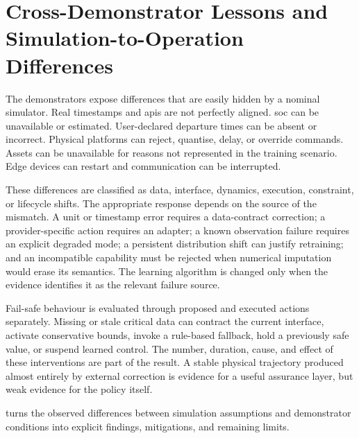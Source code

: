\section{Cross-Demonstrator Lessons and Simulation-to-Operation Differences}
\label{sec:real-lessons}
\label{sec:sim2op}

The demonstrators expose differences that are easily hidden by a nominal simulator. Real timestamps and \glspl{api} are not perfectly aligned. \gls{soc} can be unavailable or estimated. User-declared departure times can be absent or incorrect. Physical platforms can reject, quantise, delay, or override commands. Assets can be unavailable for reasons not represented in the training scenario. Edge devices can restart and communication can be interrupted.

These differences are classified as data, interface, dynamics, execution, constraint, or lifecycle shifts. The appropriate response depends on the source of the mismatch. A unit or timestamp error requires a data-contract correction; a provider-specific action requires an adapter; a known observation failure requires an explicit degraded mode; a persistent distribution shift can justify retraining; and an incompatible capability must be rejected when numerical imputation would erase its semantics. The learning algorithm is changed only when the evidence identifies it as the relevant failure source.

Fail-safe behaviour is evaluated through proposed and executed actions separately. Missing or stale critical data can contract the current interface, activate conservative bounds, invoke a rule-based fallback, hold a previously safe value, or suspend learned control. The number, duration, cause, and effect of these interventions are part of the result. A stable physical trajectory produced almost entirely by external correction is evidence for a useful assurance layer, but weak evidence for the policy itself.

 turns the observed differences between simulation assumptions and demonstrator conditions into explicit findings, mitigations, and remaining limits.


